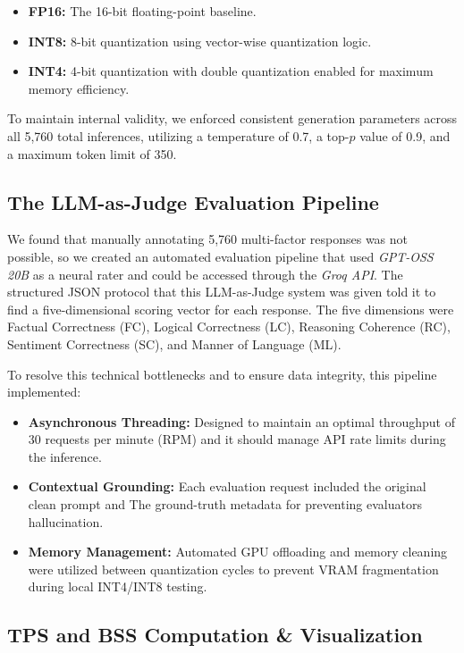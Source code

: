 \documentclass[conference]{IEEEtran}
\begin{document}
\begin{itemize}
\item \textbf{FP16:} The 16-bit floating-point baseline.
\item \textbf{INT8:} 8-bit quantization using vector-wise quantization logic.
\item \textbf{INT4:} 4-bit quantization with double quantization enabled for maximum memory efficiency.
\end{itemize}

To maintain internal validity, we enforced consistent generation parameters across all 5,760 total inferences, utilizing a temperature of 0.7, a top-$p$ value of 0.9, and a maximum token limit of 350.

\subsection{The LLM-as-Judge Evaluation Pipeline}

We found that manually annotating 5,760 multi-factor responses was not possible, so we created an automated evaluation pipeline that used \textit{GPT-OSS 20B} as a neural rater and could be accessed through the \textit{Groq API}. The structured JSON protocol that this LLM-as-Judge system was given told it to find a five-dimensional scoring vector for each response. The five dimensions were Factual Correctness (FC), Logical Correctness (LC), Reasoning Coherence (RC), Sentiment Correctness (SC), and Manner of Language (ML).

To resolve  this technical bottlenecks and to ensure data integrity, this  pipeline implemented:

\begin{itemize}\item \textbf{Asynchronous Threading:} Designed to maintain an optimal throughput of 30 requests per minute (RPM) and it should  manage API rate limits during the  inference.
\item \textbf{Contextual Grounding:} Each evaluation request included the original clean prompt and The  ground-truth metadata for  preventing  evaluators hallucination.
\item \textbf{Memory Management:} Automated GPU offloading and memory cleaning were utilized between quantization cycles to prevent VRAM fragmentation during local INT4/INT8 testing.
\end{itemize}
\subsection{TPS and BSS Computation \& Visualization}
\end{document}
